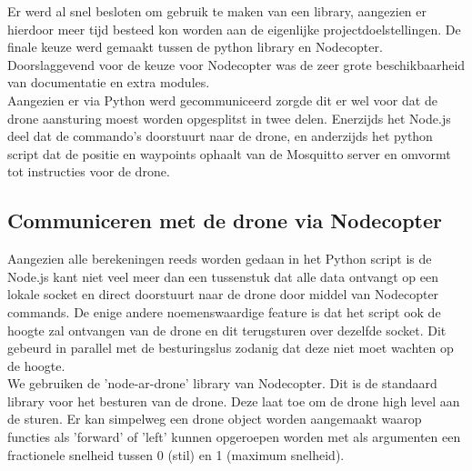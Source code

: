 Er werd al snel besloten om gebruik te maken van een library, aangezien er hierdoor meer tijd besteed kon worden aan de eigenlijke projectdoelstellingen.
De finale keuze werd gemaakt tussen de python library en Nodecopter.
Doorslaggevend voor de keuze voor Nodecopter was de zeer grote beschikbaarheid van documentatie en extra modules.\\
Aangezien er via Python werd gecommuniceerd zorgde dit er wel voor dat de drone aansturing moest worden opgesplitst in twee delen.
Enerzijds het Node.js deel dat de commando's doorstuurt naar de drone, en anderzijds het python script dat de positie en waypoints ophaalt van de Mosquitto server en omvormt tot instructies voor de drone.

\subsection{Communiceren met de drone via Nodecopter}
Aangezien alle berekeningen reeds worden gedaan in het Python script is de Node.js kant niet veel meer dan een tussenstuk dat alle data ontvangt op een lokale socket en direct doorstuurt naar de drone door middel van Nodecopter commands.
De enige andere noemenswaardige feature is dat het script ook de hoogte zal ontvangen van de drone en dit terugsturen over dezelfde socket.
Dit gebeurd in parallel met de besturingslus zodanig dat deze niet moet wachten op de hoogte.\\

We gebruiken de 'node-ar-drone' library van Nodecopter.
Dit is de standaard library voor het besturen van de drone.
Deze laat toe om de drone high level aan de sturen.
Er kan simpelweg een drone object worden aangemaakt waarop functies als 'forward' of 'left' kunnen opgeroepen worden met als argumenten een fractionele snelheid tussen 0 (stil) en 1 (maximum snelheid).\\

